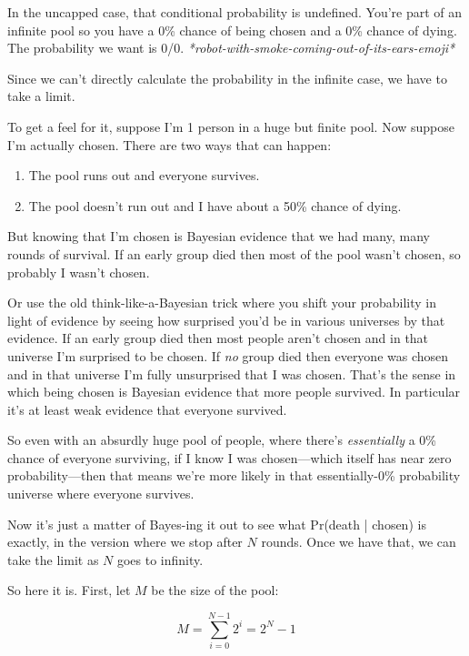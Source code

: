 \documentclass[article,twocolumn]{memoir}
\begin{document}
In the uncapped case, that conditional probability is undefined. 
You're part of an infinite pool so you have a 0\% chance of being chosen and a 0\% chance of dying. 
The probability we want is 0/0. 
\emph{*robot-with-smoke-coming-out-of-its-ears-emoji*}

Since we can't directly calculate the probability in the infinite case, we have to take a limit.

\vspace{2em}

To get a feel for it, suppose I'm 1 person in a huge but finite pool. 
Now suppose I'm actually chosen. 
There are two ways that can happen: 
\begin{enumerate}
\item The pool runs out and everyone survives.
\item The pool doesn't run out and I have about a 50\% chance of dying. 
\end{enumerate}
But knowing that I'm chosen is Bayesian evidence that we had many, many rounds of survival. 
If an early group died then most of the pool wasn't chosen, so probably I wasn't chosen.

Or use the old think-like-a-Bayesian trick where you shift your probability in light of evidence by seeing how surprised you'd be in various universes by that evidence.
If an early group died then most people aren't chosen and in that universe I'm surprised to be chosen. 
If \emph{no} group died then everyone was chosen and in that universe I'm fully unsurprised that I was chosen. 
That's the sense in which being chosen is Bayesian evidence that more people survived. 
In particular it's at least weak evidence that everyone survived.

So even with an absurdly huge pool of people, where there's \emph{essentially} a 0\% chance of everyone surviving, if I know I was chosen---which itself has near zero probability---then that means we're more likely in that essentially-0\% probability universe where everyone survives.

\vspace{2em}

Now it's just a matter of Bayes-ing it out to see what Pr(death | chosen) is exactly, in the version where we stop after $N$ rounds.
Once we have that, we can take the limit as $N$ goes to infinity.

So here it is.
First, let $M$ be the size of the pool:

$$M = \sum_{i=0}^{N-1} 2^i = 2^N-1$$
\end{document}
